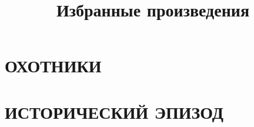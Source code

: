 \documentclass{book}
\title{Избранные произведения}
\date{}
\begin{document}
\maketitle

\chapter{ОХОТНИКИ}


\chapter{ИСТОРИЧЕСКИЙ ЭПИЗОД}

\end{document}
